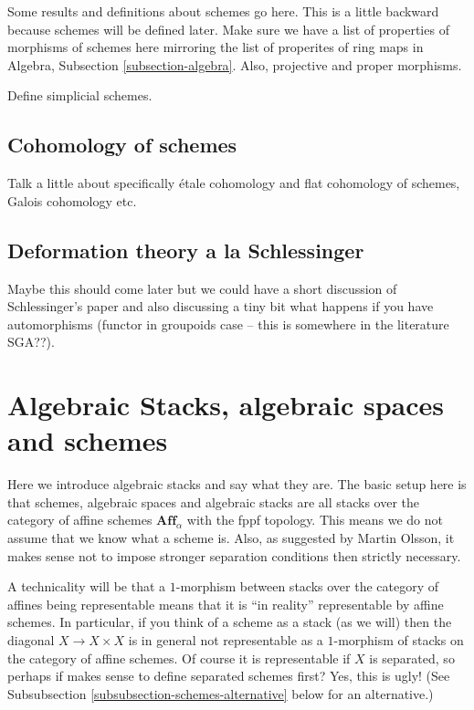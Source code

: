 \noindent
Some results and definitions about schemes go here. This is a little backward
because schemes will be defined later. Make sure we have a list of properties
of morphisms of schemes here mirroring the list of properites of ring maps
in Algebra, Subsection \ref{subsection-algebra}.
Also, projective and proper morphisms.

\smallskip\noindent
Define simplicial schemes.

\subsection{Cohomology of schemes}
\label{subsection-schemes-cohomology}

\noindent
Talk a little about specifically \'etale cohomology and flat cohomology
of schemes, Galois cohomology etc.

\subsection{Deformation theory a la Schlessinger}
\label{subsection-deformation-schlessinger}

\noindent
Maybe this should come later but we could have a short discussion of 
Schlessinger's paper and also discussing a tiny bit what happens if 
you have automorphisms (functor in groupoids case -- this is somewhere
in the literature SGA??).

\section{Algebraic Stacks, algebraic spaces and schemes}
\label{section-algebraic-stacks}

\noindent
Here we introduce algebraic stacks and say what they are. The basic setup
here is that schemes, algebraic spaces and algebraic stacks are all
stacks over the category of affine schemes $\textbf{Aff}_\alpha$ with
the fppf topology. This means we do not assume that we know what a scheme
is. Also, as suggested by Martin Olsson, it makes sense not to impose 
stronger separation conditions then strictly necessary.

\smallskip\noindent
A technicality will be that a $1$-morphism between stacks over the category
of affines being representable means that it is ``in reality'' representable
by affine schemes. In particular, if you think of a scheme as a stack (as we
will) then the diagonal $X \to X\times X$ is in general not representable as
a $1$-morphism of stacks on the category of affine schemes. Of course it is
representable if $X$ is separated, so perhaps if makes sense to define 
separated schemes first? Yes, this is ugly! (See
Subsubsection \ref{subsubsection-schemes-alternative} below for an alternative.)

